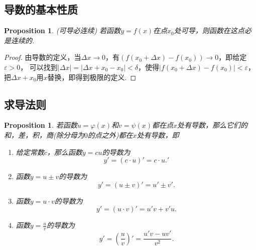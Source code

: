 \documentclass{article}
\newtheorem{proposition}[theorem]{Proposition}
\begin{document}
\subsection{导数的基本性质}

\begin{proposition}
\rm {\color{red} (可导必连续)} 若函数$y = f(x)$在点$x_0$处可导，则函数在这点必是连续的.
\end{proposition}

\begin{proof}
由导数的定义，当$\Delta x \rightarrow 0$，有$(f(x_0 + \Delta x) - f(x_0)) \rightarrow 0$，即给定$\varepsilon > 0$， 可以找到$|\Delta x| = |\Delta x + x_0-x_0| < \delta$，使得$|f(x_0 + \Delta x) - f(x_0)| < \varepsilon$，把$\Delta x+ x_0$用$x$替换，即得到极限的定义.
\end{proof}

\subsection{求导法则}

\begin{proposition}
\rm 若函数$u=\varphi(x)$和$v=\psi(x)$都在点$x$处有导数，那么它们的和，差，积，商(除分母为$0$的点之外)都在$x$处有导数，即
\begin{enumerate}
	\item 给定常数$c$，那么函数$y = cu$的导数为 
	$$
	y' = (c\cdot u)' = c \cdot u.'
	$$
	\item 函数$y = u \pm v$的导数为
	$$
	y' = (u \pm v)' = u' \pm v'.
	$$
	\item 函数$y = u \cdot v$的导数为
	$$
	y' = (u \cdot v)' = u'v + v'u.
	$$
	\item 函数$y = \frac{u}{v}$的导数为
	$$
	y' = (\frac{u}{v})' = \frac{u'v - uv'}{v^2}.
	$$
\end{enumerate}
\end{proposition}
\end{document}
